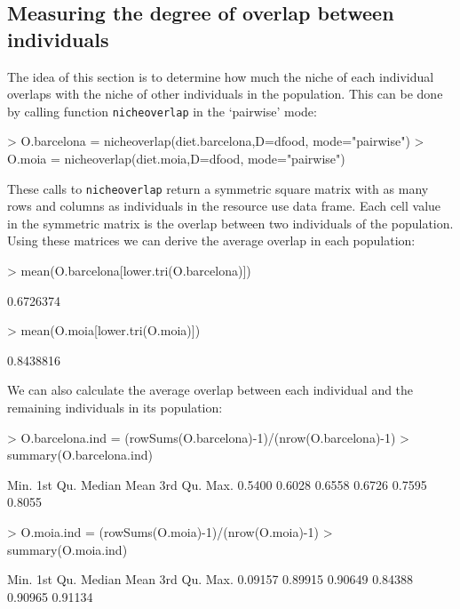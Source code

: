 \documentclass[11pt,a4paper]{article}
\begin{document}
\subsection{Measuring the degree of overlap between individuals}
The idea of this section is to determine how much the niche of each individual overlaps with the niche of other individuals in the population. This can be done by calling function \texttt{nicheoverlap} in the `pairwise' mode:
\begin{Schunk}
\begin{Sinput}
> O.barcelona = nicheoverlap(diet.barcelona,D=dfood, mode="pairwise")
> O.moia = nicheoverlap(diet.moia,D=dfood, mode="pairwise")
\end{Sinput}
\end{Schunk}
These calls to \texttt{nicheoverlap} return a symmetric square matrix with as many rows and columns as individuals in the resource use data frame. Each cell value in the symmetric matrix is the overlap between two individuals of the population. Using these matrices we can derive the average overlap in each population:
\begin{Schunk}
\begin{Sinput}
> mean(O.barcelona[lower.tri(O.barcelona)])
\end{Sinput}
\begin{Soutput}
[1] 0.6726374
\end{Soutput}
\begin{Sinput}
> mean(O.moia[lower.tri(O.moia)])
\end{Sinput}
\begin{Soutput}
[1] 0.8438816
\end{Soutput}
\end{Schunk}
We can also calculate the average overlap between each individual and the remaining individuals in its population:
\begin{Schunk}
\begin{Sinput}
> O.barcelona.ind = (rowSums(O.barcelona)-1)/(nrow(O.barcelona)-1)
> summary(O.barcelona.ind)
\end{Sinput}
\begin{Soutput}
   Min. 1st Qu.  Median    Mean 3rd Qu.    Max. 
 0.5400  0.6028  0.6558  0.6726  0.7595  0.8055 
\end{Soutput}
\begin{Sinput}
> O.moia.ind = (rowSums(O.moia)-1)/(nrow(O.moia)-1)
> summary(O.moia.ind)
\end{Sinput}
\begin{Soutput}
   Min. 1st Qu.  Median    Mean 3rd Qu.    Max. 
0.09157 0.89915 0.90649 0.84388 0.90965 0.91134 
\end{Soutput}
\end{Schunk}
\end{document}
